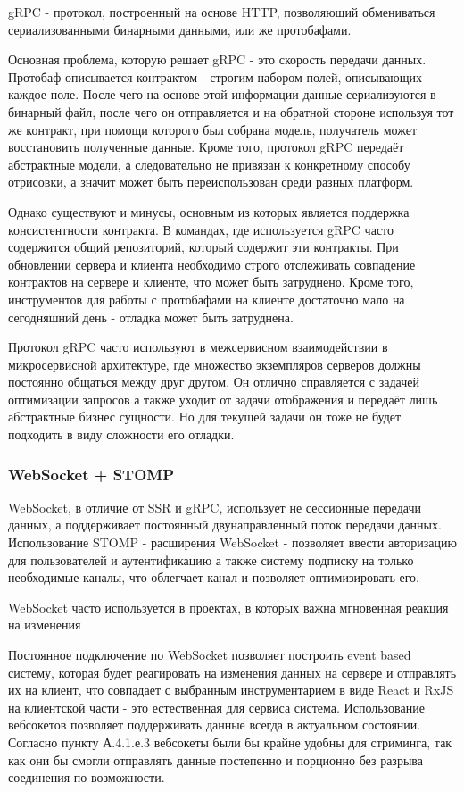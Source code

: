 \documentclass[14pt]{extarticle}
\begin{document}
gRPC - протокол, построенный на основе HTTP, позволяющий обмениваться сериализованными бинарными данными, или же протобафами.

Основная проблема, которую решает gRPC - это скорость передачи данных. Протобаф описывается контрактом - строгим набором полей, 
описывающих каждое поле. После чего на основе этой информации данные сериализуются в бинарный файл, после чего он отправляется
и на обратной стороне используя тот же контракт, при помощи которого был собрана модель, получатель может
восстановить полученные данные. Кроме того, протокол gRPC передаёт абстрактные модели, а следовательно не привязан
к конкретному способу отрисовки, а значит может быть переиспользован среди разных платформ.

Однако существуют и минусы, основным из которых является поддержка консистентности контракта. В командах, где используется
gRPC часто содержится общий репозиторий, который содержит эти контракты. При обновлении сервера и клиента необходимо строго
отслеживать совпадение контрактов на сервере и клиенте, что может быть затруднено. Кроме того, инструментов для работы с 
протобафами на клиенте достаточно мало на сегодняшний день - отладка может быть затруднена.

Протокол gRPC часто используют в межсервисном взаимодействии в микросервисной архитектуре, где множество экземпляров серверов должны постоянно общаться между друг другом. 
Он отлично справляется с задачей оптимизации запросов а также уходит от задачи отображения и передаёт лишь абстрактные
бизнес сущности. Но для текущей задачи он тоже не будет подходить в виду сложности его отладки.

\subsubsection{WebSocket + STOMP}

WebSocket, в отличие от SSR и gRPC, использует не сессионные передачи данных, а поддерживает постоянный двунаправленный поток передачи данных.
Использование STOMP - расширения WebSocket - позволяет ввести авторизацию для пользователей и аутентификацию а также систему
подписку на только необходимые каналы, что облегчает канал и позволяет оптимизировать его.

WebSocket часто используется в проектах, в которых важна мгновенная реакция на изменения

Постоянное подключение по WebSocket позволяет построить event based систему, которая будет реагировать на изменения
данных на сервере и отправлять их на клиент, что совпадает с выбранным инструментарием в виде React и RxJS на клиентской части - 
это естественная для сервиса система. Использование вебсокетов позволяет поддерживать данные всегда в актуальном состоянии. 
Согласно пункту А.4.1.е.3 вебсокеты были бы крайне удобны для стриминга, так как они бы смогли отправлять данные постепенно
и порционно без разрыва соединения по возможности.
\end{document}
